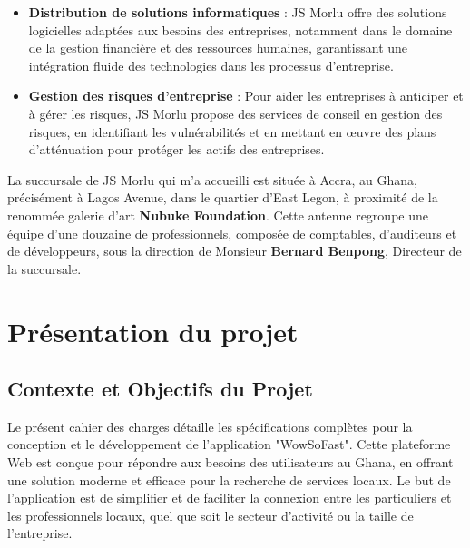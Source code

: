 {\begin{itemize}
\vspace{0.3cm}

\item \textbf{Distribution de solutions informatiques} :
JS Morlu offre des solutions logicielles adaptées aux besoins des entreprises, notamment dans le domaine de la gestion financière et des ressources humaines, garantissant une intégration fluide des technologies dans les processus d’entreprise.

\vspace{0.3cm}

\item \textbf{Gestion des risques d'entreprise} :
Pour aider les entreprises à anticiper et à gérer les risques, JS Morlu propose des services de conseil en gestion des risques, en identifiant les vulnérabilités et en mettant en œuvre des plans d’atténuation pour protéger les actifs des entreprises.

\end{itemize}

\vspace{0.5cm}

La succursale de JS Morlu qui m'a accueilli est située à Accra, au Ghana, précisément à Lagos Avenue, dans le quartier d'East Legon, à proximité de la renommée galerie d'art \textbf{Nubuke Foundation}. Cette antenne regroupe une équipe d'une douzaine de professionnels, composée de comptables, d'auditeurs et de développeurs, sous la direction de Monsieur \textbf{Bernard Benpong}, Directeur de la succursale.

\chapter{Présentation du projet}

\section{Contexte et Objectifs du Projet}

Le présent cahier des charges détaille les spécifications complètes pour la conception et le développement de l'application "WowSoFast". Cette plateforme Web est conçue pour répondre aux besoins des utilisateurs au Ghana, en offrant une solution moderne et efficace pour la recherche de services locaux. Le but de l'application est de simplifier et de faciliter la connexion entre les particuliers et les professionnels locaux, quel que soit le secteur d'activité ou la taille de l'entreprise.

}
